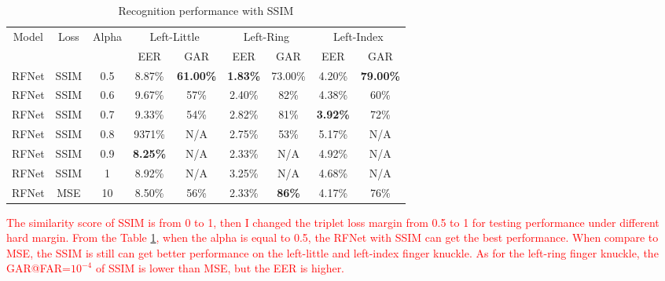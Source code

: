 \begin{table}[ht]
    \centering
    \caption{Recognition performance with SSIM}
    \begin{tabular}{ccccccccc}
    \hline
    \multirow{2}{*}{Model} & \multirow{2}{*}{Loss} & \multirow{2}{*}{Alpha} & \multicolumn{2}{c}{Left-Little}    & \multicolumn{2}{c}{Left-Ring}   & \multicolumn{2}{c}{Left-Index}     \\
                           &                       &                        & EER             & GAR              & EER             & GAR           & EER             & GAR              \\ \hline
    RFNet                  & SSIM                  & 0.5                    & 8.87\%          & \textbf{61.00\%} & \textbf{1.83\%} & 73.00\%       & 4.20\%          & \textbf{79.00\%} \\
    RFNet                  & SSIM                  & 0.6                    & 9.67\%          & 57\%             & 2.40\%          & 82\%          & 4.38\%          & 60\%             \\
    RFNet                  & SSIM                  & 0.7                    & 9.33\%          & 54\%             & 2.82\%          & 81\%          & \textbf{3.92\%} & 72\%             \\
    RFNet                  & SSIM                  & 0.8                    & 9371\%          & N/A              & 2.75\%          & 53\%          & 5.17\%          & N/A              \\
    RFNet                  & SSIM                  & 0.9                    & \textbf{8.25\%} & N/A              & 2.33\%          & N/A           & 4.92\%          & N/A              \\
    RFNet                  & SSIM                  & 1                      & 8.92\%          & N/A              & 3.25\%          & N/A           & 4.68\%          & N/A              \\
    RFNet                  & MSE                   & 10                     & 8.50\%          & 56\%             & 2.33\%          & \textbf{86\%} & 4.17\%          & 76\%             \\ \hline
    \end{tabular}
    \label{ssim}
\end{table}

\textcolor{red}{The similarity score of SSIM is from 0 to 1, then I changed the triplet loss margin from 0.5 to 1 for testing performance under different hard margin. From the Table \ref{ssim}, when the alpha is equal to 0.5, the RFNet with SSIM can get the best performance. When compare to MSE, the SSIM is still can get better performance on the left-little and left-index finger knuckle. As for the left-ring finger knuckle, the GAR@FAR=${10^{-4}}$ of SSIM is lower than MSE, but the EER is higher.}

